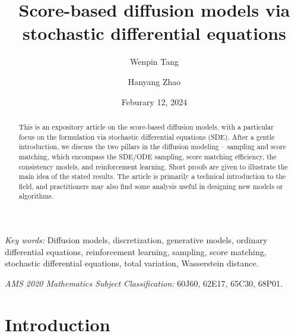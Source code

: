 \documentclass[letterpaper,11pt,reqno]{amsart}
\numberwithin{equation}{section}
\begin{document}
\title[Diffusion models]{Score-based diffusion models via stochastic differential equations}

\author[Wenpin Tang]{{Wenpin} Tang}
\address{Department of Industrial Engineering and Operations Research, Columbia University. 
} 

\author[Hanyang Zhao]{{Hanyang} Zhao}
\address{Department of Industrial Engineering and Operations Research, Columbia University. 
} 

\date{Feburary 12, 2024} 
\begin{abstract}
This is an expository article on the score-based diffusion models, 
with a particular focus on the formulation via stochastic differential equations (SDE).
After a gentle introduction, 
we discuss the two pillars in the diffusion modeling --
sampling and score matching, 
which encompass the SDE/ODE sampling, 
score matching efficiency,
the consistency models, 
and reinforcement learning.
Short proofs are given to illustrate the main idea of the stated results. 
The article is primarily a technical introduction to the field,
and practitioners may also find some analysis useful in designing new models or algorithms.
\end{abstract}


\maketitle
\textit{Key words:} Diffusion models, discretization, generative models, ordinary differential equations, 
reinforcement learning, sampling, score matching, stochastic differential equations, total variation,
Wasserstein distance.

\smallskip
\textit{AMS 2020 Mathematics Subject Classification:} 60J60, 62E17, 65C30, 68P01.

\smallskip
\begin{center}
\qquad \qquad \qquad \qquad \qquad {}
\end{center}


\section{Introduction}
\label{sc1}
\end{document}
